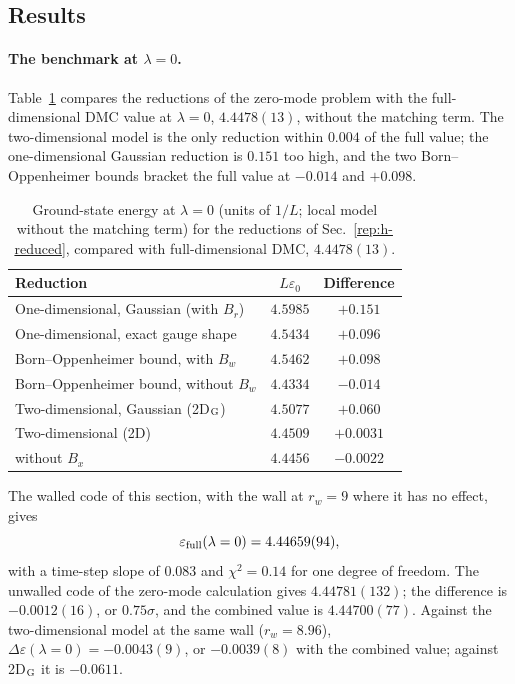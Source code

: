 \subsection{Results}\label{sec:v18-results}

\paragraph{The benchmark at $\lambda=0$.}
Table~\ref{tab:v18-lam0} compares the reductions of the zero-mode problem with the full-dimensional DMC value at $\lambda=0$, $4.4478(13)$, without the matching term. %
The two-dimensional model is the only reduction within $0.004$ of the full value; the one-dimensional Gaussian reduction is $0.151$ too high, and the two Born--Oppenheimer bounds bracket the full value at $-0.014$ and $+0.098$.

\begin{table}[t]
\centering
\caption{Ground-state energy at $\lambda=0$ (units of $1/L$; local model without the matching term) for the reductions of Sec.~\ref{rep:h-reduced}, compared with full-dimensional DMC, $4.4478(13)$.}
\label{tab:v18-lam0}
\begin{tabular}{lcc}
\toprule
Reduction & $L\varepsilon_0$ & Difference \\
\midrule
One-dimensional, Gaussian (with $B_r$) & $4.5985$ & $+0.151$ \\ %
One-dimensional, exact gauge shape & $4.5434$ & $+0.096$ \\ %
Born--Oppenheimer bound, with $B_w$ & $4.5462$ & $+0.098$ \\ %
Born--Oppenheimer bound, without $B_w$ & $4.4334$ & $-0.014$ \\ %
Two-dimensional, Gaussian (2D$_{\rm G}$) & $4.5077$ & $+0.060$ \\ %
Two-dimensional (2D) & $4.4509$ & $+0.0031$ \\ %
\quad without $B_x$ & $4.4456$ & $-0.0022$ \\ %
\bottomrule
\end{tabular}
\end{table}

The walled code of this section, with the wall at $r_w=9$ where it has no effect, gives
\begin{equation}
\varepsilon_{\rm full}(\lambda=0)=4.44659(94),
\label{eq:v18-lam0}
\end{equation}
with a time-step slope of $0.083$ and $\chi^2=0.14$ for one degree of freedom. %
The unwalled code of the zero-mode calculation gives $4.44781(132)$; the difference is $-0.0012(16)$, or $0.75\sigma$, and the combined value is $4.44700(77)$. %
Against the two-dimensional model at the same wall ($r_w=8.96$), $\Delta\varepsilon(\lambda=0)=-0.0043(9)$, or $-0.0039(8)$ with the combined value; against 2D$_{\rm G}$ it is $-0.0611$. %

